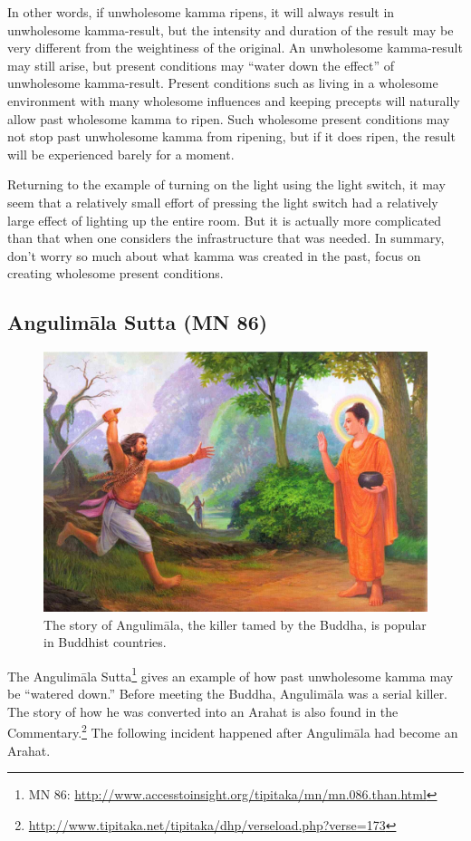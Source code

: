 In other words, if unwholesome kamma ripens, it will always result in unwholesome kamma-result, but the intensity and duration of the result may be very different from the weightiness of the original. An unwholesome kamma-result may still arise, but present conditions may “water down the effect” of unwholesome kamma-result. Present conditions such as living in a wholesome environment with many wholesome influences and keeping precepts will naturally allow past wholesome kamma to ripen. Such wholesome present conditions may not stop past unwholesome kamma from ripening, but if it does ripen, the result will be experienced barely for a moment.

Returning to the example of turning on the light using the light switch, it may seem that a relatively small effort of pressing the light switch had a relatively large effect of lighting up the entire room. But it is actually more complicated than that when one considers the infrastructure that was needed. In summary, don’t worry so much about what kamma was created in the past, focus on creating wholesome present conditions.

\pagebreak

\subsection*{Angulimāla Sutta (MN 86)}

\begin{figure}[h]
\centering
\includegraphics[width=0.7\linewidth]{./Diagrams/angulimala}
\caption{The story of Angulimāla, the killer tamed by the Buddha, is popular in Buddhist countries.}
\label{fig:angulimala}
\end{figure}

The Angulimāla Sutta\footnote{MN 86: \url{http://www.accesstoinsight.org/tipitaka/mn/mn.086.than.html}} gives an example of how past unwholesome kamma may be “watered down.” Before meeting the Buddha, Angulimāla was a serial killer. The story of how he was converted into an Arahat is also found in the Commentary.\footnote{\url{http://www.tipitaka.net/tipitaka/dhp/verseload.php?verse=173}} The following incident happened after Angulimāla had become an Arahat.

